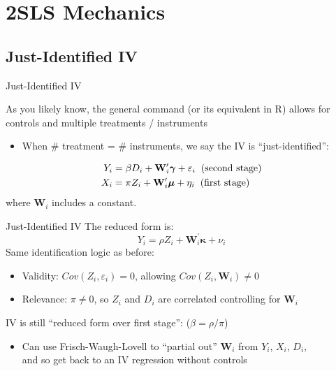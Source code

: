 \documentclass{beamer}
\begin{document}
\section{2SLS Mechanics}

\subsection{Just-Identified IV}
\begin{frame}{Just-Identified IV}

As you likely know, the general  command (or its equivalent  in R) allows for controls and multiple treatments / instruments
\begin{itemize}
  \item When \# treatment = \# instruments, we say the IV is ``just-identified'':
\end{itemize}\pause\vspace{-0.5cm}

\begin{align*}
Y_i &=  \beta D_i +\mathbf{W}_i^\prime\boldsymbol{\gamma} +  \varepsilon_i\hspace{0.2cm}\text{(second stage)}\\
X_i &= \pi Z_i + \mathbf{W}_i^\prime\boldsymbol{\mu} + \eta_i\hspace{0.2cm}\text{(first stage)}
\end{align*}
where $\mathbf{W}_i$ includes a constant.
\end{frame}

\begin{frame}{Just-Identified IV}
The reduced form is: $$Y_i= \rho Z_i + \mathbf{W}_i^\prime\boldsymbol{\kappa}+\nu_i $$\pause
Same identification logic as before:

\begin{itemize}
  \item Validity: $Cov(Z_i,\varepsilon_i)=0$, allowing $Cov(Z_i,\mathbf{W}_i)\neq 0$\pause
  \item Relevance: $\pi\neq 0$, so $Z_i$ and $D_i$ are correlated controlling for $\mathbf{W}_i$
\end{itemize}\pause\medskip

IV is still ``reduced form over first stage'': ($\beta=\rho/\pi$)\pause\vspace{0.1cm}
\begin{itemize}
  \item Can use Frisch-Waugh-Lovell to ``partial out'' $\mathbf{W}_i$ from $Y_i$, $X_i$, $D_i$, \\ and so get back to an IV regression without controls
\end{itemize}
\end{frame}
\end{document}
